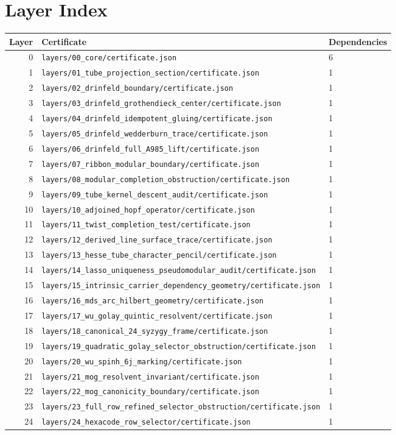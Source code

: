 \section*{Layer Index}
\begin{longtable}{rll}
\toprule
Layer & Certificate & Dependencies \\
\midrule
0 & \texttt{layers/00\_core/certificate.json} & 6 \\
1 & \texttt{layers/01\_tube\_projection\_section/certificate.json} & 1 \\
2 & \texttt{layers/02\_drinfeld\_boundary/certificate.json} & 1 \\
3 & \texttt{layers/03\_drinfeld\_grothendieck\_center/certificate.json} & 1 \\
4 & \texttt{layers/04\_drinfeld\_idempotent\_gluing/certificate.json} & 1 \\
5 & \texttt{layers/05\_drinfeld\_wedderburn\_trace/certificate.json} & 1 \\
6 & \texttt{layers/06\_drinfeld\_full\_A985\_lift/certificate.json} & 1 \\
7 & \texttt{layers/07\_ribbon\_modular\_boundary/certificate.json} & 1 \\
8 & \texttt{layers/08\_modular\_completion\_obstruction/certificate.json} & 1 \\
9 & \texttt{layers/09\_tube\_kernel\_descent\_audit/certificate.json} & 1 \\
10 & \texttt{layers/10\_adjoined\_hopf\_operator/certificate.json} & 1 \\
11 & \texttt{layers/11\_twist\_completion\_test/certificate.json} & 1 \\
12 & \texttt{layers/12\_derived\_line\_surface\_trace/certificate.json} & 1 \\
13 & \texttt{layers/13\_hesse\_tube\_character\_pencil/certificate.json} & 1 \\
14 & \texttt{layers/14\_lasso\_uniqueness\_pseudomodular\_audit/certificate.json} & 1 \\
15 & \texttt{layers/15\_intrinsic\_carrier\_dependency\_geometry/certificate.json} & 1 \\
16 & \texttt{layers/16\_mds\_arc\_hilbert\_geometry/certificate.json} & 1 \\
17 & \texttt{layers/17\_wu\_golay\_quintic\_resolvent/certificate.json} & 1 \\
18 & \texttt{layers/18\_canonical\_24\_syzygy\_frame/certificate.json} & 1 \\
19 & \texttt{layers/19\_quadratic\_golay\_selector\_obstruction/certificate.json} & 1 \\
20 & \texttt{layers/20\_wu\_spinh\_6j\_marking/certificate.json} & 1 \\
21 & \texttt{layers/21\_mog\_resolvent\_invariant/certificate.json} & 1 \\
22 & \texttt{layers/22\_mog\_canonicity\_boundary/certificate.json} & 1 \\
23 & \texttt{layers/23\_full\_row\_refined\_selector\_obstruction/certificate.json} & 1 \\
24 & \texttt{layers/24\_hexacode\_row\_selector/certificate.json} & 1 \\
\bottomrule
\end{longtable}
